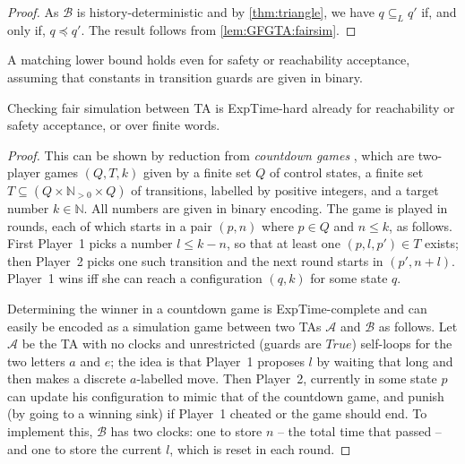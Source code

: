 \documentclass[10pt,a4paper]{amsart}
\theoremstyle{definition}
\numberwithin{equation}{section}
\newcommand{\N}{\mathbb{N}}
\newcommand{\x}{\times}
\newcommand{\auta}{\mathcal{A}}
\newcommand{\autb}{\mathcal{B}}
\newcommand{\exptime}{\EXPTIME}
\newcommand{\langincl}[1][L]{\subseteq_{L}}
\newcommand{\fairsim}[1][]{\preceq}
\newcommand{\EXPTIME}{{\sc ExpTime}}
\begin{document}
\begin{proof}
    As $\autb$ is history-deterministic and by
    \cref{thm:triangle},
    we have 
    $q\langincl q'$ if, and only if,
    $q\fairsim q'$.
    The result follows from 
    \cref{lem:GFGTA:fairsim}.
\end{proof}



A matching lower bound holds even for safety or reachability acceptance, assuming that constants in transition guards are given in binary.
\begin{lemma}
    \label{lem:GFGTA:fairsim-lb}
    Checking fair simulation between TA is \exptime-hard already for reachability or safety acceptance, or over finite words.
\end{lemma}
\begin{proof}
This can be shown by reduction from \emph{countdown games} \cite{JLS2008},
which are two-player games $(Q,T,k)$ given by a finite set $Q$ of control states, a finite set $T \subseteq (Q \x \N_{>0} \x Q)$ of transitions, labelled by positive integers, and a target number $k\in\N$.
All numbers are given in binary encoding.
The game is played in rounds, each of which starts in a pair $(p,n)$ where $p\in Q$ and $n \le k$,
as follows.
First Player~1 picks a number $l \le k-n$, so that at least one $(p,l,p')\in T$ exists;
then Player~2 picks one such transition and the next round starts in $(p',n+l)$.
Player~1 wins iff she can reach a configuration $(q,k)$ for some state $q$.

Determining the winner in a countdown game is \exptime-complete \cite{JLS2008}
and can easily be encoded as a simulation game between two TAs $\auta$ and $\autb$ as follows.
Let $\auta$ be the TA with no clocks and unrestricted (guards are $\mathit{True}$) self-loops 
for the two letters $a$ and $e$;
the idea is that Player~1 proposes $l$ by waiting that long and then makes a discrete $a$-labelled move.
Then Player~2, currently in some state $p$ can update his configuration to mimic that of the countdown game,
and punish (by going to a winning sink) if Player~1 cheated or the game should end.
To implement this, $\autb$ has two clocks: one to store $n$ -- the total time that passed -- and one to store the current $l$, which is reset in each round.


\end{proof}
\end{document}
